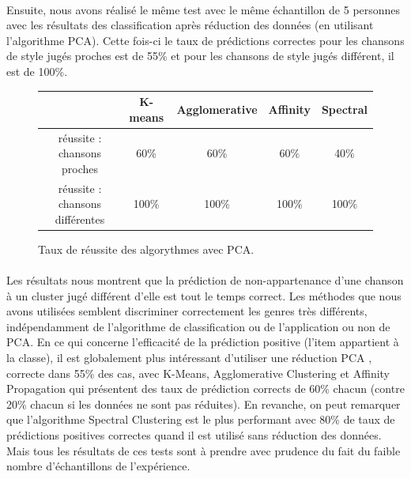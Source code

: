 \documentclass[soumission]{ir}
\begin{document}
\paragraph{}
Ensuite, nous avons réalisé le même test avec le même échantillon de 5 personnes avec les résultats des 
classification après réduction des données (en utilisant l’algorithme PCA). Cette fois-ci le taux de prédictions 
correctes pour les chansons de style jugés proches est de 55\% et pour les chansons de style jugés différent, il 
est de 100\%.

\begin{figure}[ht]
    \centering
    \begin{tabular}{ccccc}
        \phantom & K-means & Agglomerative & Affinity & Spectral\\
        \hline
        réussite : chansons proches & 60\%& 60\% & 60\% & 40\%\\
        réussite : chansons différentes & 100\% & 100\% & 100\% & 100\%\\
        \hline
    \end{tabular}
    \caption{Taux de réussite des algorythmes avec PCA.}
    \label{test_pca}
\end{figure}

\paragraph{}
Les résultats nous montrent que la prédiction de non-appartenance d’une chanson à un cluster jugé différent d’elle
est tout le temps correct. Les méthodes que nous avons utilisées semblent discriminer correctement les genres très 
différents, indépendamment de l’algorithme de classification ou de l’application ou non de PCA. En ce qui 
concerne l'efficacité de la prédiction positive (l’item appartient à la classe), il est globalement plus 
intéressant d’utiliser une réduction PCA , correcte dans 55\% des cas, avec K-Means, Agglomerative Clustering et 
Affinity Propagation qui présentent des taux de prédiction corrects de 60\% chacun (contre 20\% chacun si les 
données ne sont pas réduites). En revanche, on peut remarquer que l’algorithme Spectral Clustering est le plus 
performant avec 80\% de taux de prédictions positives correctes quand il est utilisé sans réduction des données. 
Mais tous les résultats de ces tests sont à prendre avec prudence du fait du faible nombre d'échantillons de 
l’expérience.
\end{document}
